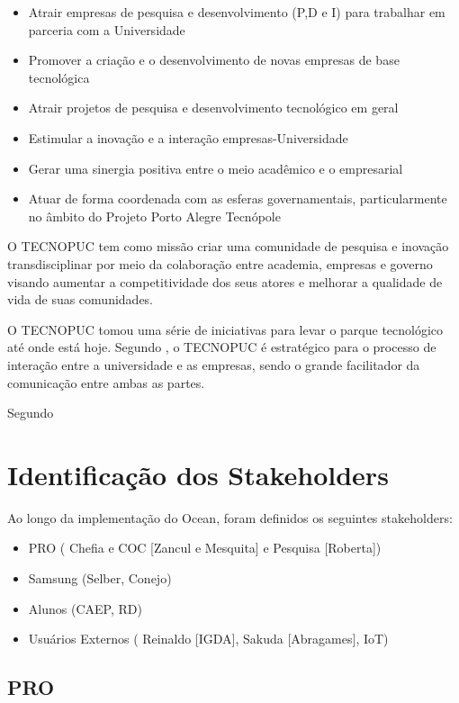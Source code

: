\begin{itemize}
\item Atrair empresas de pesquisa e desenvolvimento (P,D e I) para trabalhar em parceria com a Universidade
\item Promover a criação e o desenvolvimento de novas empresas de base tecnológica
\item Atrair projetos de pesquisa e desenvolvimento tecnológico em geral
\item Estimular a inovação e a interação empresas-Universidade
\item Gerar uma sinergia positiva entre o meio acadêmico e o empresarial
\item Atuar de forma coordenada com as esferas governamentais, particularmente no âmbito do Projeto Porto Alegre Tecnópole
\end{itemize}

O TECNOPUC tem como missão criar uma comunidade de pesquisa e inovação transdisciplinar por meio da colaboração entre academia, empresas e governo visando aumentar a competitividade dos seus atores e melhorar a qualidade de vida de suas comunidades.

O TECNOPUC tomou uma série de iniciativas para levar o parque tecnológico até onde está hoje. Segundo , o TECNOPUC é estratégico para o processo de interação entre a universidade e as empresas, sendo o grande facilitador da comunicação entre ambas as partes.

Segundo 

\section{Identificação dos Stakeholders}
\label{sec:identificacao_stakeholders}

Ao longo da implementação do Ocean, foram definidos os seguintes stakeholders:

\begin{itemize}
\item PRO ( Chefia e COC [Zancul e Mesquita] e Pesquisa [Roberta])
\item Samsung (Selber, Conejo)
\item Alunos (CAEP, RD)
\item Usuários Externos ( Reinaldo [IGDA], Sakuda [Abragames], IoT)
\end{itemize}

\subsection{PRO}
\label{sec:con_pro}

